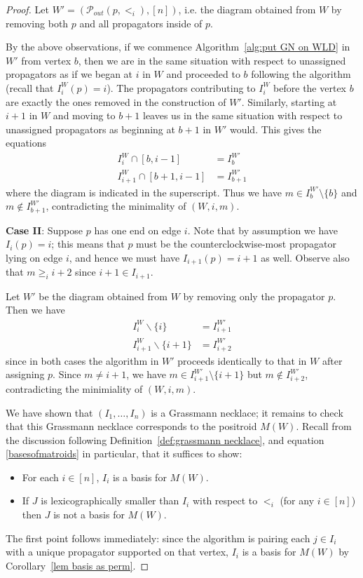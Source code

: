 \documentclass[11pt]{article}
\newcommand{\sanote}{\todo[color=violet!30]}
\newcommand{\cP}{\mathcal{P}}
\theoremstyle{remark}
\theoremstyle{definition}
\begin{document}
\begin{proof}
Let $W' = (\cP_{out}(p,<_i), [n])$, i.e. the diagram obtained from $W$ by removing both $p$ and all propagators inside of $p$.

By the above observations, if we commence Algorithm~\ref{alg:put GN on WLD} in $W'$ from vertex $b$, then we are in the same situation with respect to unassigned propagators as if we began at $i$ in $W$ and proceeded to $b$ following the algorithm (recall that $I^W_i(p) =i$). The propagators contributing to $I_{i}^W$ before the vertex $b$ are exactly the ones removed in the construction of $W'$.  Similarly, starting at $i+1$ in $W$ and moving to $b+1$ leaves us in the same situation with respect to unassigned propagators as beginning at $b+1$ in $W'$ would.  This gives the equations
\begin{align*}
  I_i^{W} \cap [b,i-1] & = I_b^{W'} \\
  I_{i+1}^{W} \cap [b+1,i-1] & = I_{b+1}^{W'}
\end{align*} 
where the diagram is indicated in the superscript.
Thus we have $m\in I_b^{W'}\setminus\{b\}$ and $m\not\in I_{b+1}^{W'}$, contradicting the minimality of $(W, i, m)$.

\textbf{Case II}: Suppose $p$ has one end on edge $i$.  Note that by assumption we have $I_i(p) = i$; this means that $p$ must be the counterclockwise-most propagator lying on edge $i$, and hence we must have $I_{i+1}(p) = i+1$ as well.  Observe also that $m\geq_i i+2$ since $i+1\in I_{i+1}$.

Let $W'$ be the diagram obtained from $W$ by removing only the propagator $p$.  Then we have
\begin{align*}
  I_i^{W} \backslash \{i\} & = I_{i+1}^{W'} \\
  I_{i+1}^{W} \backslash \{i+1\} & = I_{i+2}^{W'}
\end{align*}
since in both cases the algorithm in $W'$ proceeds identically to that in $W$ after assigning $p$. Since $m \neq i+1$, we have $m\in I_{i+1}^{W'}\setminus\{i+1\}$ but $m\not\in I_{i+2}^{W'}$, contradicting the minimiality of $(W, i, m)$.


\medskip  \sanote{Suggested breakpoint of theorem}

We have shown that $(I_1,\dots,I_n)$ is a Grassmann necklace; it remains to check that this Grassmann necklace corresponds to the positroid $M(W)$.  Recall from the discussion following Definition~\ref{def:grassmann necklace}, and equation \eqref{basesofmatroids} in particular, that it suffices to show: 
\begin{itemize}
\item For each $i \in [n]$, $I_i$ is a basis for $M(W)$.
\item If $J$ is lexicographically smaller than $I_i$ with respect to $<_i$ (for any $i \in [n]$) then $J$ is not a basis for $M(W)$. 
\end{itemize}
The first point follows immediately: since the algorithm is pairing each $j \in I_i$ with a unique propagator supported on that vertex, $I_i$ is a basis for $M(W)$ by Corollary~\ref{lem basis as perm}.


\end{proof}
\end{document}
